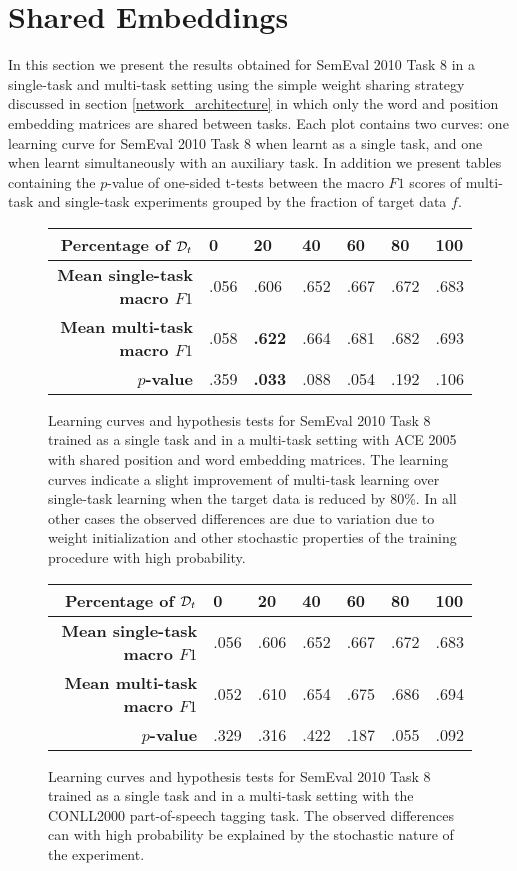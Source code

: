 \section{Shared Embeddings}
In this section we present the results obtained for SemEval 2010 Task 8 in a single-task and multi-task setting using the simple weight sharing strategy discussed in section \ref{network_architecture} in which only the word and position embedding matrices are shared between tasks. Each plot contains two curves: one learning curve for SemEval 2010 Task 8 when learnt as a single task, and one when learnt simultaneously with an auxiliary task. In addition we present tables containing the $p$-value of one-sided t-tests between the macro $F1$ scores of multi-task and single-task experiments grouped by the fraction of target data $f$.
\begin{figure}[h]
	\centering
	
	\vspace*{1cm}
	
	\begin{tabular}{r | l | l | l | l | l | l}
		\textbf{Percentage of $\mathcal{D}_t$} & 0 & 20 & 40 & 60 & 80 & 100 \\  \hline
		\textbf{Mean single-task macro $F1$} & .056 & .606 & .652 & .667 & .672 & .683\\
		\textbf{Mean multi-task macro $F1$} & .058 & \textbf{.622} & .664 & .681 & .682 & .693\\
		$p$\textbf{-value} & .359 & \textbf{.033} & .088 & .054 & .192 & .106
	\end{tabular}
	\caption{Learning curves and hypothesis tests for SemEval 2010 Task 8 trained as a single task and in a multi-task setting with ACE 2005 with shared position and word embedding matrices. The learning curves indicate a slight improvement of multi-task learning over single-task learning when the target data is reduced by 80\%. In all other cases the observed differences are due to variation due to weight initialization and other stochastic properties of the training procedure with high probability.}
\end{figure}
\newpage
\begin{figure}[h]
	\centering
	
	\vspace*{1cm}
	
	\begin{tabular}{r | l | l | l | l | l | l}
		\textbf{Percentage of $\mathcal{D}_t$} & 0 & 20 & 40 & 60 & 80 & 100 \\  \hline
		\textbf{Mean single-task macro $F1$} & .056 & .606 & .652 & .667 & .672 & .683\\
		\textbf{Mean multi-task macro $F1$} & .052 & .610 & .654 & .675 & .686 & .694\\
		$p$\textbf{-value} & .329 & .316 & .422 & .187 & .055 & .092
	\end{tabular}
	\caption{Learning curves and hypothesis tests for SemEval 2010 Task 8 trained as a single task and in a multi-task setting with the CONLL2000 part-of-speech tagging task. The observed differences can with high probability be explained by the stochastic nature of the experiment.}
\end{figure}
